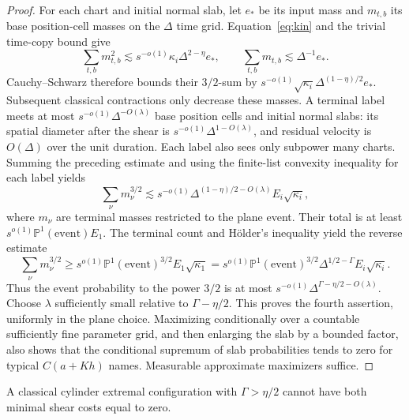 \begin{proof}
For each chart and initial normal slab, let $e_*$ be its input mass
and $m_{t,b}$ its base position-cell masses on the $\Delta$ time grid.
Equation~\eqref{eq:kin} and the trivial time-copy bound give
\[
 \sum_{t,b}m_{t,b}^2
 \lesssim s^{-o(1)}\kappa_i\Delta^{2-\eta}e_*,
 \qquad \sum_{t,b}m_{t,b}\lesssim\Delta^{-1}e_*.
\]
Cauchy--Schwarz therefore bounds their $3/2$-sum by
$s^{-o(1)}\sqrt{\kappa_i}\Delta^{(1-\eta)/2}e_*$.
Subsequent classical contractions only decrease these masses.
A terminal label meets at most
$s^{-o(1)}\Delta^{-O(\lambda)}$ base position cells and initial
normal slabs: its spatial diameter after the shear is
$s^{-o(1)}\Delta^{1-O(\lambda)}$, and residual velocity is
$O(\Delta)$ over the unit duration. Each label also sees only
subpower many charts. Summing the preceding estimate and using
the finite-list convexity inequality for each label yields
\[
 \sum_\nu m_\nu^{3/2}
 \lesssim s^{-o(1)}\Delta^{(1-\eta)/2-O(\lambda)}
                  E_i\sqrt{\kappa_i},
\]
where $m_\nu$ are terminal masses restricted to the plane event.
Their total is at least
$s^{o(1)}\mathbb P^1(\text{event})E_1$. The terminal count and
H\"older's inequality yield the reverse estimate
\[
 \sum_\nu m_\nu^{3/2}
 \geq s^{o(1)}\mathbb P^1(\text{event})^{3/2}
          E_1\sqrt{\kappa_1}
 =s^{o(1)}\mathbb P^1(\text{event})^{3/2}
   \Delta^{1/2-\Gamma}E_i\sqrt{\kappa_i}.
\]
Thus the event probability to the power $3/2$ is at most
$s^{-o(1)}\Delta^{\Gamma-\eta/2-O(\lambda)}$.
Choose $\lambda$ sufficiently small relative to $\Gamma-\eta/2$.
This proves the fourth assertion, uniformly in the plane choice.
Maximizing conditionally over a countable sufficiently fine parameter
grid, and then enlarging the slab by a bounded factor, also shows that
the conditional supremum of slab probabilities tends to zero for
typical $C(a+Kh)$ names. Measurable approximate maximizers suffice.
\end{proof}

\begin{proposition}
\label{low:classical-zero-cost}
A classical cylinder extremal configuration with
$\Gamma>\eta/2$ cannot have both minimal shear costs equal to zero.
\end{proposition}

